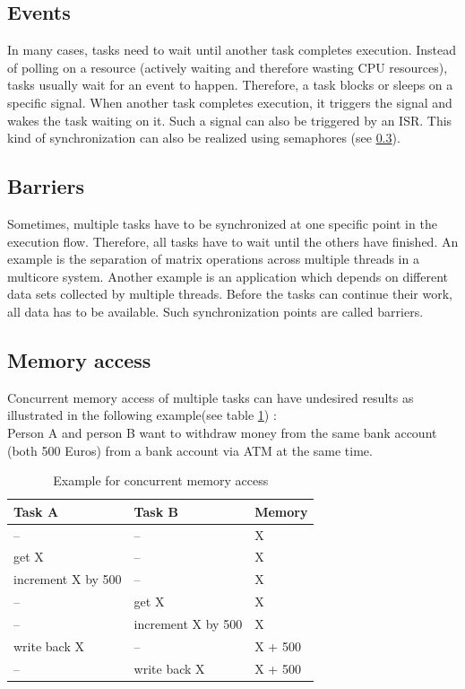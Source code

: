 \subsection{Events}
In many cases, tasks need to wait until another task completes execution.
Instead of polling on a resource (actively waiting and therefore wasting \ac{CPU} resources), tasks usually wait for an event to happen.
Therefore, a task blocks or sleeps on a specific signal.
When another task completes execution, it triggers the signal and wakes the task waiting on it.
Such a signal can also be triggered by an \ac{ISR}.
This kind of synchronization can also be realized using semaphores (see \ref{ss_memory_access}).

\subsection{Barriers}\label{ss_barriers}
Sometimes, multiple tasks have to be synchronized at one specific point in the execution flow.
Therefore, all tasks have to wait until the others have finished.
An example is the separation of matrix operations across multiple threads in a multicore system. 
Another example is an application which depends on different data sets collected by multiple threads.
Before the tasks can continue their work, all data has to be available.
Such synchronization points are called barriers.

\subsection{Memory access}\label{ss_memory_access}
Concurrent memory access of multiple tasks can have undesired results as illustrated in the following example(see table \ref{tab_example_concurrent_memory_access}) :\\
Person A and person B want to withdraw money from the same bank account (both 500 Euros) from a bank account via ATM at the same time.

\begin{table}[htbp]
	\centering
		\begin{tabular}{|l|l|l|}
			\hline
				Task A 							& Task B 							& Memory  \\
				\hline 
				-- 									& -- 									& X 			\\
			  get X 							& -- 									& X				\\
			  increment X by 500 	& --									& X				\\
			  --									& get X								& X				\\
		 		--		 							& increment X by 500	& X				\\
			  write back X			 	& --									& X	+ 500	\\
			  --									& write back X				& X + 500	\\				   
			\hline
		\end{tabular}
	\caption{Example for concurrent memory access}
	\label{tab_example_concurrent_memory_access}
\end{table}

